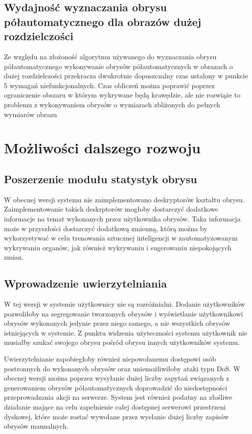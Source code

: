 \documentclass[a4paper,11pt,twoside]{report}
\theoremstyle{definition}
\begin{document}
\subsection {Wydajność wyznaczania obrysu półautomatycznego dla obrazów dużej rozdzielczości}

Ze względu na złożoność algorytmu używanego do wyznaczania obrysu półautomatycznego wykonywanie obrysów półautomatycznych w obrazach o dużej rozdzielczości przekracza dwukrotnie dopuszczalny czas ustalony w punkcie 5 wymagań niefunkcjonalnych. Czas obliczeń można poprawić poprzez ograniczenie obszaru w którym wykrywane będą krawędzie, ale nie rozwiąże to problemu z wykonywaniem obrysów o wymiarach zbliżonych do pełnych wymiarów obrazu

\section {Możliwości dalszego rozwoju}

\subsection {Poszerzenie modułu statystyk obrysu}

W obecnej wersji systemu nie zaimplementowano deskryptorów kształtu obrysu. Zaimplementowanie takich deskrptorów mogłoby dostarczyć dodatkowe informacje na temat wykonanych przez użytkownika obrysów. Taka informacja może w przyszłości dostarczyć dodatkową zmienną, którą można by wykorzystywać w celu trenowania sztucznej inteligencji w zautomatyzowanym wykrywaniu organów, jak również wykrywaniu i sugerowaniu niepokojących zmian.

\subsection {Wprowadzenie uwierzytelniania}

W tej wersji w systemie użytkownicy nie są rozróżnialni. Dodanie użytkowników pozwoliłoby na segregowanie tworzonych obrysów i wyświetlanie użytkownikowi obrysów wykonanych jedynie przez niego samego, a nie wszystkich obrysów istniejących w systemie. Z punktu widzenia użyteczności systemu użytkownik nie musiałby szukać swojego obrysu pośród obrysu innych użytkowników systemu. 

Uwierzytelnianie zapobiegłoby również niepowołanemu dostępowi osób postronnych do wykonanych obrysów oraz uniemożliwiłoby ataki typu DoS. W obecnej wersji można poprzez wysyłanie dużej liczby zapytań związanych z generowaniem obrysów półautomatycznych doprowadzić do niedostępności przeprowadzania akcji na serwerze. System jest również podatny na złośliwe działanie mające na celu zapełnienie całej dostępnej serwerowi przestrzeni dyskowej, które może zostać wywołane przez wysłanie dużej liczby zapisów obrysów manualnych.
\end{document}
